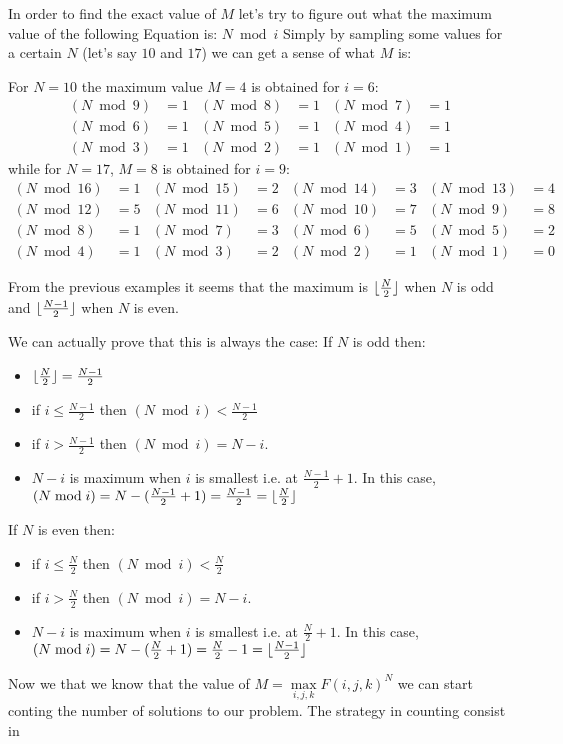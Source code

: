 In order to find the exact value of $M$ let's try to figure out what the maximum value of the following Equation is: $N \bmod{i}$
Simply by sampling some values for a certain $N$ (let's say $10$ and $17$) we can get a sense of what $M$ is:

For $N=10$ the maximum value $M=4$ is obtained for $i=6$:
\begin{align*}
	(N \bmod{9}) &= 1  & (N \bmod{8}) &= 1 & (N \bmod{7}) &= 1 \\
	(N \bmod{6}) &= 1  & (N \bmod{5}) &= 1 & (N \bmod{4}) &= 1 \\
	(N \bmod{3}) &= 1  & (N \bmod{2}) &= 1 & (N \bmod{1}) &= 1 
\end{align*}
while for $N=17$, $M=8$ is obtained for $i=9$:
\begin{align*}
	(N \bmod{16}) &= 1  & (N \bmod{15}) &= 2 & (N \bmod{14}) &= 3 & (N \bmod{13}) &= 4 \\
	(N \bmod{12}) &= 5  & (N \bmod{11}) &= 6 & (N \bmod{10}) &= 7 & (N \bmod{9})  &= 8 \\
	(N \bmod{8})  &= 1  & (N \bmod{7})  &= 3 & (N \bmod{6})  &= 5 & (N \bmod{5})  &= 2 \\
	(N \bmod{4})  &= 1  & (N \bmod{3})  &= 2 & (N \bmod{2})  &= 1 & (N \bmod{1})  &= 0 
\end{align*}

From the previous examples it seems that the maximum is $ \lfloor\frac{N}{2}\rfloor$ when $N$ is odd and $ \lfloor\frac{N-1}{2}\rfloor$  when $N$ is even.


We can actually prove that this is always the case:
If $N$ is odd then:
\begin{itemize}
	\item $\lfloor\frac{N}{2}\rfloor = \frac{N-1}{2}$
	\item if $i \leq \frac{N-1}{2}$ then $(N \bmod{i}) < \frac{N-1}{2}$
	\item if $i > \frac{N-1}{2}$ then $(N \bmod{i}) = N-i$. 
	\item $N-i$ is maximum when $i$ is smallest i.e. at $\frac{N-1}{2}+1$. In this case, $(N \bmod{i}) = N - (\frac{N-1}{2}+1) = \frac{N-1}{2} = \lfloor\frac{N}{2}\rfloor$
\end{itemize}

If $N$ is even then:
\begin{itemize}
	\item if $i \leq \frac{N}{2}$ then $(N \bmod{i}) < \frac{N}{2}$
	\item if $i > \frac{N}{2}$ then $(N \bmod{i}) = N-i$. 
	\item $N-i$ is maximum when $i$ is smallest i.e. at $\frac{N}{2}+1$. In this case, $(N \bmod{i}) = N - (\frac{N}{2}+1) = \frac{N}{2}-1 = \lfloor\frac{N-1}{2}\rfloor$
\end{itemize}

Now we that we know that the value of $M = \max\limits_{i,j,k}F(i,j,k)^N$ we can start conting the number of solutions to our problem.
The strategy in counting consist in 



